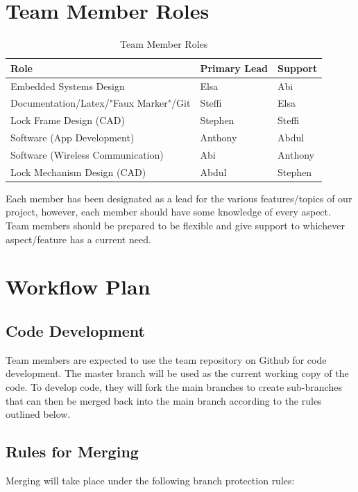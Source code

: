 \documentclass{article}
\begin{document}
\section{Team Member Roles}

\begin{table}[h]
\caption{Team Member Roles} \label{TblTeamMemberRoles}
\begin{tabularx}{\textwidth}{llX}
\toprule
\textbf{Role} & \textbf{Primary Lead} & \textbf{Support}\\
\midrule
Embedded Systems Design & Elsa & Abi\\
Documentation/Latex/"Faux Marker"/Git & Steffi & Elsa\\
Lock Frame Design (CAD) & Stephen & Steffi\\
Software (App Development) & Anthony & Abdul\\
Software (Wireless Communication) & Abi & Anthony\\
Lock Mechanism Design (CAD) & Abdul & Stephen\\
\bottomrule
\end{tabularx}
\end{table}

Each member has been designated as a lead for the various features/topics of our project, however, each member should have some knowledge of every aspect.  Team members should be prepared to be flexible and give support to whichever aspect/feature has a current need. 

\section{Workflow Plan}

\subsection{Code Development}

Team members are expected to use the team repository on Github for code development. The master branch will be used as the current working copy of the code. To develop code, they will fork the main branches to create sub-branches that can then be merged back into the main branch according to the rules outlined below. 

\subsection{Rules for Merging}

Merging will take place under the following branch protection rules: 
\end{document}
